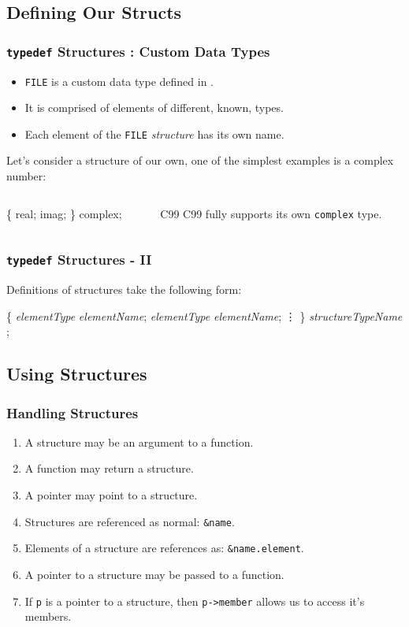 \documentclass[smaller,table]{beamer} %
\begin{document}
\subsection{Defining Our Structs}
\begin{frame}[fragile]
\frametitle{{\tt typedef} Structures : Custom Data Types}
\begin{itemize}
\item {\tt FILE} is a custom data type defined in .
\item It is comprised of elements of different, known, types.
\item Each element of the {\tt FILE} \emph{structure} has its own name.
\end{itemize}

Let's consider a structure of our own, one of the simplest examples is a complex number:
\begin{columns}
\begin{column}{5cm}
\begin{semiverbatim}
\{
    real;
    imag;
\} complex;
\end{semiverbatim}
\end{column}
\begin{column}{5cm}
\begin{alertblock}{C99}
C99 fully supports its own {\tt complex}
type.
\end{alertblock}
\end{column}
\end{columns}
\end{frame}

\begin{frame}[fragile]
\frametitle{{\tt typedef} Structures - II}
Definitions of structures take the following form:
\begin{semiverbatim}
   \{
      \emph{elementType} \emph{elementName};
      \emph{elementType} \emph{elementName};
      \vdots
   \} \emph{structureTypeName} ;
\end{semiverbatim}
\end{frame}

\subsection{Using Structures}
\begin{frame}
\frametitle{Handling Structures}
\begin{enumerate}
\item A structure may be an argument to a function.
\item A function may return a structure.
\item A pointer may point to a structure.
\item Structures are referenced as normal: {\tt \&name}.
\item Elements of a structure are references as: {\tt \&name.element}.
\item A pointer to a structure may be passed to a function.
\item If {\tt p} is a pointer to a structure, then {\tt p->member} allows us to access it's members.
\end{enumerate}
\end{frame}
\end{document}
